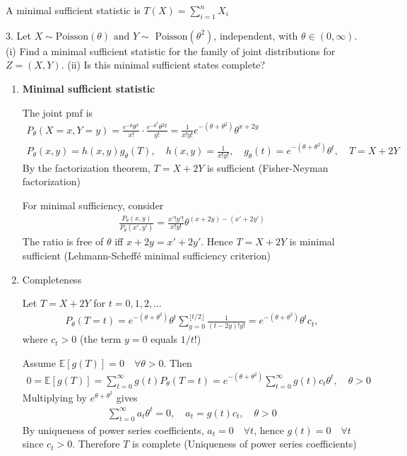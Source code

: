 \documentclass[10pt]{article}
\begin{document}
A minimal sufficient statistic is $T(X) = \sum_{i = 1}^{n} X_i $

\hfill

3. Let $X \sim \text{Poisson}(\theta) \text{ and } Y \sim \text{ Poisson}(\theta^2)$, independent, with $\theta \in (0, \infty)$. (i) Find a minimal sufficient statistic for the family of joint distributions for $Z = (X, Y)$. (ii) Is this minimal sufficient states complete?

\begin{enumerate}[label=(\roman*)]
    \item \textbf{Minimal sufficient statistic}
    
    The joint pmf is 
    \begin{gather*}
        P_\theta(X = x, Y = y) = \frac{e^{-\theta}\theta^x}{x!} \cdot \frac{e^{-\theta^2}\theta^{2y}}{y!} = \frac{1}{x!y!}e^{-(\theta + \theta^2)}\theta^{x + 2y} \\
        P_{\theta}(x, y) = h(x, y)g_\theta(T),\quad h(x,y) = \frac{1}{x!y!},\quad g_\theta(t) = e^{-(\theta + \theta^2)}\theta^t,\quad T = X + 2Y
    \end{gather*}
    By the factorization theorem, $T = X + 2Y $ is sufficient (Fisher-Neyman factorization)

    For minimal sufficiency, consider
    \begin{gather*}
        \frac{P_\theta(x, y)}{P_\theta(x', y')} = \frac{x'!y'!}{x!y!}\theta^{(x + 2y) - (x' + 2y')}
    \end{gather*}
    The ratio is free of $\theta $ iff $x + 2y = x' + 2y' $. Hence $T = X + 2Y $ is minimal sufficient (Lehmann-Scheffé minimal sufficiency criterion)
    \newpage
    \item Completeness
    
    Let $T = X + 2Y $ for $t = 0, 1, 2, … $
    \begin{gather*}
        P_\theta(T = t) = e^{-(\theta + \theta^2)}\theta^t\sum_{y = 0}^{\lfloor t / 2 \rfloor}\frac{1}{(t - 2y)!y!} = e^{-(\theta + \theta^2)}\theta^tc_t,
    \end{gather*}
    where $c_t > 0 $ (the term $y = 0 $ equals $1 / t!$)

    Assume $\mathbb{E}[g(T)] = 0 \quad\forall \theta > 0 $. Then 
    \begin{gather*}
        0 = \mathbb{E}[g(T)] = \sum_{t = 0}^{\infty}g(t)P_\theta(T = t) = e^{-(\theta + \theta^2)}\sum_{t = 0}^{\infty}g(t)c_t\theta^t,\quad\theta > 0
    \end{gather*}
    Multiplying by $e^{\theta + \theta^2}$ gives 
    \begin{gather*}
        \sum_{t = 0}^{\infty}a_t\theta^t = 0,\quad a_t = g(t)c_t,\quad\theta > 0
    \end{gather*}
    By uniqueness of power series coefficients, $a_t = 0 \quad\forall t $, hence $g(t) = 0\quad\forall t $ since $c_t > 0 $. Therefore $T $ is complete (Uniqueness of power series coefficients)
\end{enumerate}
\end{document}
